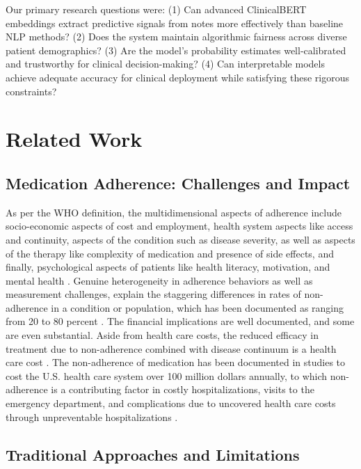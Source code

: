 \documentclass{article}
\begin{document}
Our primary research questions were: (1) Can advanced ClinicalBERT embeddings extract predictive signals from notes more effectively than baseline NLP methods? (2) Does the system maintain algorithmic fairness across diverse patient demographics? (3) Are the model's probability estimates well-calibrated and trustworthy for clinical decision-making? (4) Can interpretable models achieve adequate accuracy for clinical deployment while satisfying these rigorous constraints?

\section{Related Work}\label{sec:related}

\subsection{Medication Adherence: Challenges and Impact}\label{subsec:challenges}

As per the WHO definition, the multidimensional aspects of adherence include socio-economic aspects of cost and employment, health system aspects like access and continuity, aspects of the condition such as disease severity, as well as aspects of the therapy like complexity of medication and presence of side effects, and finally, psychological aspects of patients like health literacy, motivation, and mental health \cite{who2024,brown2016}. Genuine heterogeneity in adherence behaviors as well as measurement challenges, explain the staggering differences in rates of non-adherence in a condition or population, which has been documented as ranging from 20 to 80 percent \cite{mghihp2025,kardas2013}. The financial implications are well documented, and some are even substantial. Aside from health care costs, the reduced efficacy in treatment due to non-adherence combined with disease continuum is a health care cost \cite{viswanathan2012}. The non-adherence of medication has been documented in studies to cost the U.S. health care system over 100 million dollars annually, to which non-adherence is a contributing factor in costly hospitalizations, visits to the emergency department, and complications due to uncovered health care costs through unpreventable hospitalizations \cite{cutler2018,baumgartner2018}.

\subsection{Traditional Approaches and Limitations}\label{subsec:traditional}
\end{document}
